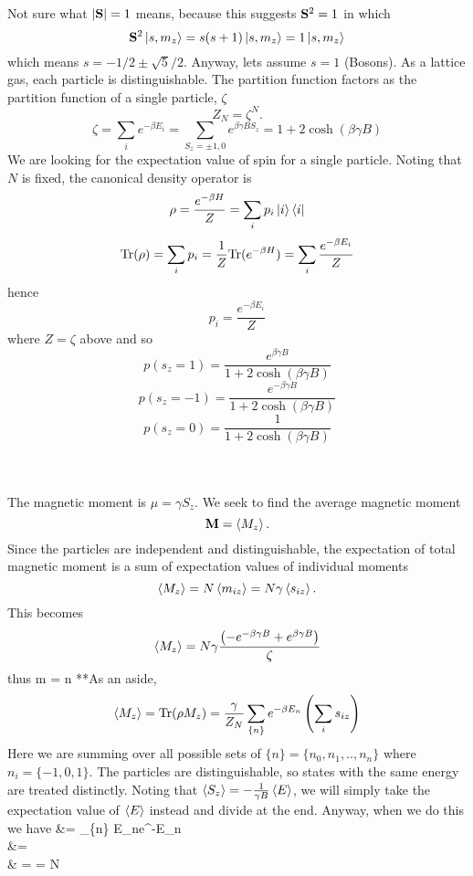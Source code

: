 \documentclass[10pt,letterpaper]{article}
\begin{document}
	\benum
	\item
	Not sure what $|\mathbf{S}|=1$ means, because this suggests $\mathbf{S}^2 = 1$ in which 
	\[
		\mathbf{S}^2\ket{s,m_z} = s(s+1)\ket{s,m_z} = 1\ket{s,m_z}
	\]
	which means $s = -1/2 \pm \sqrt 5/2$. Anyway, lets assume $s=1$ (Bosons). As a lattice gas,
	each particle is distinguishable. The partition function factors as the partition function of a single particle,
	$\zeta$
	\[
		Z_N = \zeta^N.
	\]
	\[
		\zeta = \sum_i e^{-\beta E_i} = \sum_{S_z=\pm1,0} e^{\beta\gamma B S_z} = 1+2\cosh(\beta\gamma B)
	\]
	We are looking for the expectation value of spin for a single particle. Noting that $N$ is fixed, the canonical
	density operator is
	\[
		\rho = \frac{e^{-\beta H}}{Z} = \sum_i p_i \ket i\bra i
	\]
	\[
		\text{Tr}(\rho) = \sum_i p_i = \frac{1}{Z}\text{Tr}(e^{-\beta H}) = \sum_i \frac{e^{-\beta E_i}}{Z}
	\]	
	hence
	\[	
		p_i = \frac{e^{-\beta E_i}}{Z}
	\]
	where $Z = \zeta$ above and so
	\[
		p(s_z=1) = \frac{e^{\beta\gamma B}}{1+2\cosh(\beta\gamma B)}
	\]
	\[
		p(s_z=-1) = \frac{e^{-\beta\gamma B}}{1+2\cosh(\beta\gamma B)}
	\]
	\[
		p(s_z=0) = \frac{1}{1+2\cosh(\beta\gamma B)}
	\]
	\\ \\
	\item
	The magnetic moment is $\mu = \gamma S_z$. We seek to find the average magnetic moment
	\[
		\mathbf{M} = \braket{M_z} .
	\]
	Since the particles are independent and distinguishable, the expectation of total magnetic moment
	is a sum of expectation values of individual moments
	\[
		\braket{M_z} = N\braket{m_{iz}} = N\gamma\braket{s_{iz}}.
	\]
	This becomes
	\[
		\braket{M_z} = N \gamma \frac{\left(-e^{-\beta \gamma B}+e^{\beta\gamma B}\right)}{\zeta}
	\]
	thus
	\be\label{1}
		\vect m = n\gamma  {}
	\ee
	**As an aside, 
	\[
		\braket{M_z} = \text{Tr}(\rho M_z) = \frac{\gamma}{Z_N} \sum_{\{n\}} e^{-\beta E_n}\left(\sum_i s_{iz}\right)
	\]
	Here we are summing over all possible sets of $\{ n\} = \{ n_0,n_1,..,n_n\}$ where $n_i = \{-1,0,1\}$. 
	The particles are distinguishable, so states with the same energy are treated distinctly. 
	Noting that $\braket{S_z} = -\frac{1}{\gamma B}
	\braket{E}$, we will simply take the expectation value of $\braket{E}$ instead and divide at the end.
	 Anyway, when we do this we have
	\ba
		 &=   \sum_{\{n\}} E_ne^{-\beta E_{n}}  \\
		&=  \\
		& =  = N
\end{document}
